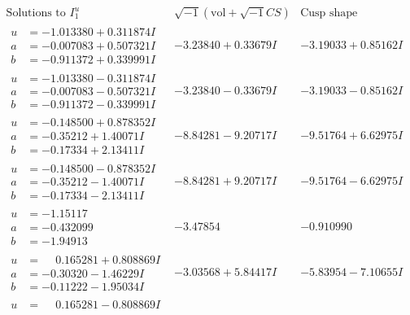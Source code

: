 \documentclass[1p]{elsarticle_modified}
\theoremstyle{definition}
\newcommand{\I}{\sqrt{-1}}
\begin{document}
$$\begin{array}{c|c|c}  
\text{Solutions to }I^u_{1}& \I (\text{vol} + \sqrt{-1}CS) & \text{Cusp shape}\\
 \hline 
\begin{aligned}
u &= -1.013380 + 0.311874 I \\
a &= -0.007083 + 0.507321 I \\
b &= -0.911372 + 0.339991 I\end{aligned}
 & -3.23840 + 0.33679 I & -3.19033 + 0.85162 I \\ \hline\begin{aligned}
u &= -1.013380 - 0.311874 I \\
a &= -0.007083 - 0.507321 I \\
b &= -0.911372 - 0.339991 I\end{aligned}
 & -3.23840 - 0.33679 I & -3.19033 - 0.85162 I \\ \hline\begin{aligned}
u &= -0.148500 + 0.878352 I \\
a &= -0.35212 + 1.40071 I \\
b &= -0.17334 + 2.13411 I\end{aligned}
 & -8.84281 - 9.20717 I & -9.51764 + 6.62975 I \\ \hline\begin{aligned}
u &= -0.148500 - 0.878352 I \\
a &= -0.35212 - 1.40071 I \\
b &= -0.17334 - 2.13411 I\end{aligned}
 & -8.84281 + 9.20717 I & -9.51764 - 6.62975 I \\ \hline\begin{aligned}
u &= -1.15117\phantom{ +0.000000I} \\
a &= -0.432099\phantom{ +0.000000I} \\
b &= -1.94913\phantom{ +0.000000I}\end{aligned}
 & -3.47854\phantom{ +0.000000I} & -0.910990\phantom{ +0.000000I} \\ \hline\begin{aligned}
u &= \phantom{-}0.165281 + 0.808869 I \\
a &= -0.30320 - 1.46229 I \\
b &= -0.11222 - 1.95034 I\end{aligned}
 & -3.03568 + 5.84417 I & -5.83954 - 7.10655 I \\ \hline\begin{aligned}
u &= \phantom{-}0.165281 - 0.808869 I \\

\end{aligned}
\end{array}$$
\end{document}
